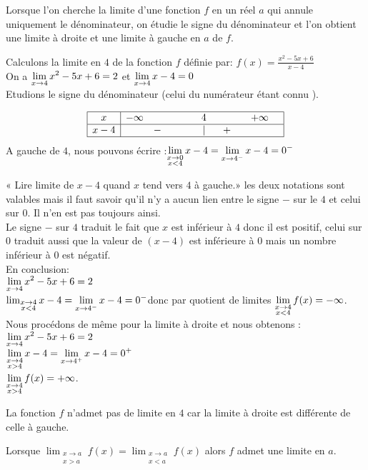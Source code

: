 Lorsque l'on cherche la limite d'une fonction $ f $ en un réel $ a $ qui annule uniquement
 le dénominateur,  on étudie le signe du dénominateur et l'on obtient une limite à droite et une limite à gauche en $ a $ de $ f $.
\begin{example}

Calculons la limite en $ 4 $ de la fonction $ f $ définie par:  \;$ f(x)=\frac{x^{2}-5x+6}{x-4} $\\
On a $ \displaystyle \lim_{x\to 4}x^{2}-5x+6 =2$ et $ \displaystyle \lim_{x\to 4}x-4 =0$\\
Etudions le signe du dénominateur \;(celui du numérateur étant connu ).



  \[\begin{array}{|c|ccccccc|}
\hline
x & -\infty & & 4&  &  & +\infty&\\ 
\hline
x-4    & & -~~~\qquad &|& ~~+ &  & &\\
\hline
\end{array}\]
A gauche de $ 4 $, nous pouvons écrire :$\displaystyle \lim_{\substack {x \to 0 \\ x< 4}}x-4 =\displaystyle \lim_{x\to 4^{-}}x-4 =0^{-}$

« Lire limite de $x-4$  quand $x$ tend vers $4$ à gauche.» les deux notations sont valables mais il
faut savoir qu'il n'y a aucun lien entre le signe $ - $ sur le $4$ et celui sur $0$. Il n'en est pas
toujours ainsi. \\
Le signe $ - $ sur $4$ traduit le fait que $x$ est inférieur à $4$ donc il est positif, celui
sur $0$ traduit aussi que la valeur de $(x-4)$ est inférieure à $0$ mais un nombre
inférieur à $0$ est négatif.\\En conclusion:\\ $ \displaystyle \lim_{x\to 4}x^{2}-5x+6 =2$\\$\lim_{\substack {x \to 4 \\ x< 4}}x-4 =\displaystyle \lim_{x\to 4^{-}}x-4 =0^{-}$\qquad donc  par quotient de limites  $\displaystyle \lim_{\substack {x \to 4 \\ x< 4}}f(x) =-\infty$.\\
Nous procédons de même pour la limite à droite et nous obtenons :\\
 $ \displaystyle \lim_{x\to 4}x^{2}-5x+6 =2$\\$\displaystyle \lim_{\substack {x \to 4 \\ x>  4}}x-4 =\displaystyle \lim_{x\to 4^{+}}x-4 =0^{+}$\\$\displaystyle \lim_{\substack {x \to 4 \\ x>4}}f(x) =+\infty$.
\end{example}
La fonction $  f $ n'admet pas de limite en $4$  car la limite à
droite est différente de celle à gauche.
\begin{remark}


Lorsque  $\displaystyle \lim_{\substack {x \to a \\ x>a}}f(x)= \displaystyle \lim_{\substack {x \to a \\ x< a}}f(x)$ alors $ f $ admet une limite en $ a $.
\end{remark}
 

